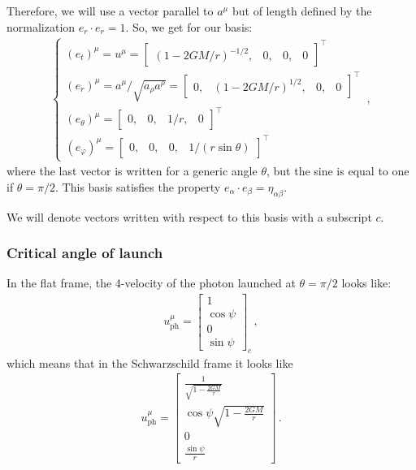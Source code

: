 \documentclass[main.tex]{subfiles}
\begin{document}
Therefore, we will use a vector parallel to \(a^{\mu }\) but of length defined by the normalization \(e_{r} \cdot e_{r} = 1\). So, we get for our basis: 
%
\begin{align}
  \begin{cases}
    (e_{t})^{\mu } = u^{\mu } = \left[\begin{array}{cccc}
    (1-2GM/r)^{-1/2}, & 0, & 0, & 0
  \end{array}\right]^{\top} \\ 
    (e_{r})^{\mu } = a^{\mu } / \sqrt{a_{\rho } a^{\rho }}
  = \left[\begin{array}{cccc}
    0, & (1-2GM/r)^{1/2}, & 0, & 0
  \end{array}\right]^{\top}  \\
  (e_{\theta })^{\mu } = \left[\begin{array}{cccc}
  0, & 0, & 1/r, & 0
  \end{array}\right]^{\top} \\
  (e_{\varphi })^{\mu } = \left[\begin{array}{cccc}
  0, & 0, & 0, & 1/(r \sin \theta )
  \end{array}\right]^{\top}
\end{cases} 
\,,
\end{align}
%
where the last vector is written for a generic angle \(\theta \), but the sine is equal to one if \(\theta = \pi /2\). 
This basis satisfies the property \(e_{\alpha } \cdot e_{\beta } = \eta_{\alpha \beta }\). 

We will denote vectors written with respect to this basis with a subscript \(c\). 

\subsubsection{Critical angle of launch}

In the flat frame, the 4-velocity of the photon launched at \(\theta = \pi /2\) looks like: 
%
\begin{align}
  u^{\mu } _{\text{ph}} = \left[\begin{array}{c}
  1 \\ 
  \cos \psi  \\ 
  0 \\ 
  \sin \psi 
  \end{array}\right]_c
\,,
\end{align}
%
which means that in the Schwarzschild frame it looks like 
%
\begin{align}
  u^{\mu }_{\text{ph}} = \left[\begin{array}{c}
  \frac{1}{\sqrt{1-\frac{2GM}{r}}} \\ 
  \cos \psi \sqrt{1 - \frac{2GM}{r}} \\ 
  0 \\ 
  \frac{\sin \psi}{r} 
  \end{array}\right]
\,.
\end{align}
\end{document}
